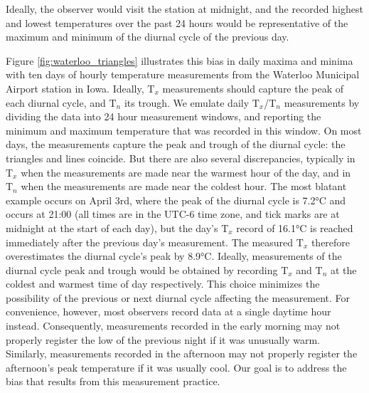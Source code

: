 \documentclass[letter]{article}
\newcommand{\T}{\mathrm{T}}
\newcommand{\Tn}{\T_{n}}
\newcommand{\Tx}{\T_{x}}
\begin{document}
Ideally, the observer would visit the station at midnight, and the recorded highest and lowest temperatures over the past 24 hours would be representative of the maximum and minimum of the diurnal cycle of the previous day.

Figure \ref{fig:waterloo_triangles} illustrates this bias in daily maxima and minima with ten days of hourly temperature measurements from the Waterloo Municipal Airport station in Iowa.
Ideally, \(\Tx\) measurements should capture the peak of each diurnal cycle, and \(\Tn\) its trough.
We emulate daily $\Tx$/$\Tn$ measurements by dividing the data into 24 hour measurement windows, and reporting the minimum and maximum temperature that was recorded in this window.
On most days, the measurements capture the peak and trough of the diurnal cycle: the triangles and lines coincide.
But there are also several discrepancies, typically in \(\Tx\) when the measurements are made near the warmest hour of the day, and in \(\Tn\) when the measurements are made near the coldest hour.
The most blatant example occurs on April 3rd,
where the peak of the diurnal cycle is 7.2°C and occurs at 21:00 (all times are in the UTC-6 time zone, and tick marks are at midnight at the start of each day), but the day's \(\Tx\) record of 16.1°C is reached immediately after the previous day's measurement.
The measured \(\Tx\) therefore overestimates the diurnal cycle's peak by 8.9°C.
Ideally, measurements of the diurnal cycle peak and trough would be obtained by recording $\Tx$ and $\Tn$ at the coldest and warmest time of day respectively.
This choice minimizes the possibility of the previous or next diurnal cycle affecting the measurement.
For convenience, however, most observers record data at a single daytime hour instead.
Consequently, measurements recorded in the early morning may not properly register the low of the previous night if it was unusually warm. 
Similarly, measurements recorded in the afternoon may not properly register the afternoon's peak temperature if it was usually cool. 
Our goal is to address the bias that results from this measurement practice.
\end{document}
